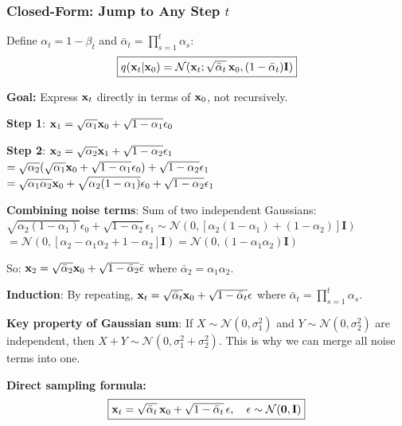 \subsubsection{Closed-Form: Jump to Any Step $t$}
Define $\alpha_t = 1 - \beta_t$ and $\bar{\alpha}_t = \prod_{s=1}^t \alpha_s$:
\begin{equation}\label{eq:forward_closed}
\boxed{q(\mathbf{x}_t|\mathbf{x}_0) = \mathcal{N}(\mathbf{x}_t; \sqrt{\bar\alpha_t}\,\mathbf{x}_0, (1-\bar\alpha_t)\mathbf{I})}
\end{equation}

\begin{keybox}
\textbf{Goal:} Express $\mathbf{x}_t$ directly in terms of $\mathbf{x}_0$, not recursively.

\textbf{Step 1}: $\mathbf{x}_1 = \sqrt{\alpha_1}\mathbf{x}_0 + \sqrt{1-\alpha_1}\epsilon_0$

\textbf{Step 2}: $\mathbf{x}_2 = \sqrt{\alpha_2}\mathbf{x}_1 + \sqrt{1-\alpha_2}\epsilon_1$\\
$= \sqrt{\alpha_2}(\sqrt{\alpha_1}\mathbf{x}_0 + \sqrt{1-\alpha_1}\epsilon_0) + \sqrt{1-\alpha_2}\epsilon_1$\\
$= \sqrt{\alpha_1\alpha_2}\mathbf{x}_0 + \sqrt{\alpha_2(1-\alpha_1)}\epsilon_0 + \sqrt{1-\alpha_2}\epsilon_1$

\textbf{Combining noise terms}: Sum of two independent Gaussians:\\
$\sqrt{\alpha_2(1-\alpha_1)}\epsilon_0 + \sqrt{1-\alpha_2}\epsilon_1 \sim \mathcal{N}(0, [\alpha_2(1-\alpha_1) + (1-\alpha_2)]\mathbf{I})$\\
$= \mathcal{N}(0, [\alpha_2 - \alpha_1\alpha_2 + 1 - \alpha_2]\mathbf{I}) = \mathcal{N}(0, (1-\alpha_1\alpha_2)\mathbf{I})$

So: $\mathbf{x}_2 = \sqrt{\bar\alpha_2}\mathbf{x}_0 + \sqrt{1-\bar\alpha_2}\bar\epsilon$ where $\bar\alpha_2 = \alpha_1\alpha_2$.

\textbf{Induction}: By repeating, $\mathbf{x}_t = \sqrt{\bar\alpha_t}\mathbf{x}_0 + \sqrt{1-\bar\alpha_t}\epsilon$ where $\bar\alpha_t = \prod_{s=1}^t \alpha_s$.

\textbf{Key property of Gaussian sum}: If $X \sim \mathcal{N}(0, \sigma_1^2)$ and $Y \sim \mathcal{N}(0, \sigma_2^2)$ are independent, then $X + Y \sim \mathcal{N}(0, \sigma_1^2 + \sigma_2^2)$. This is why we can merge all noise terms into one.
\end{keybox}

\textbf{Direct sampling formula:}
\begin{equation}\label{eq:xt_direct}
\boxed{\mathbf{x}_t = \sqrt{\bar\alpha_t}\,\mathbf{x}_0 + \sqrt{1-\bar\alpha_t}\,\epsilon, \quad \epsilon \sim \mathcal{N}(\mathbf{0},\mathbf{I})}
\end{equation}

